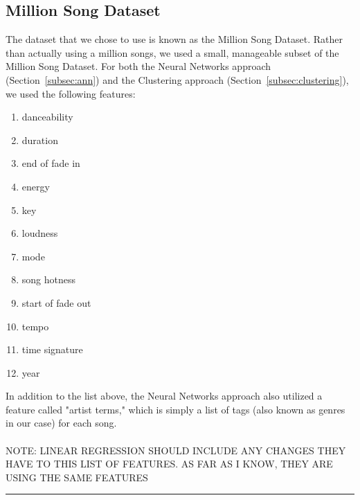 \documentclass[12pt]{article}
\newcommand{\horizontalLine}{
	\begin{center}
		\hrule width 1.0\textwidth
	\end{center}
}
\begin{document}
\subsection{Million Song Dataset}
\label{subsec:datasetIntro}
The dataset that we chose to use is known as the Million Song Dataset. Rather than actually using a million songs, we used a small, manageable subset of the Million Song Dataset. For both the Neural Networks approach (Section~\ref{subsec:ann}) and the Clustering approach (Section~\ref{subsec:clustering}), we used the following features:
\begin{enumerate}
    \item danceability
    \vspace{-3.5mm}
    \item duration
    \vspace{-3.5mm}
    \item end of fade in
    \vspace{-3.5mm}
    \item energy
    \vspace{-3.5mm}
    \item key
    \vspace{-3.5mm}
    \item loudness
    \vspace{-3.5mm}
    \item mode
    \vspace{-3.5mm}
    \item song hotness
    \vspace{-3.5mm}
    \item start of fade out
    \vspace{-3.5mm} 
    \item tempo
    \vspace{-3.5mm}
    \item time signature
    \vspace{-3.5mm}
    \item year
\end{enumerate}

In addition to the list above, the Neural Networks approach also utilized a feature called "artist terms," which is simply a list of tags (also known as genres in our case) for each song. 
\\
\\
NOTE: LINEAR REGRESSION SHOULD INCLUDE ANY CHANGES THEY HAVE TO THIS LIST OF FEATURES. AS FAR AS I KNOW, THEY ARE USING THE SAME FEATURES

\horizontalLine
\end{document}
